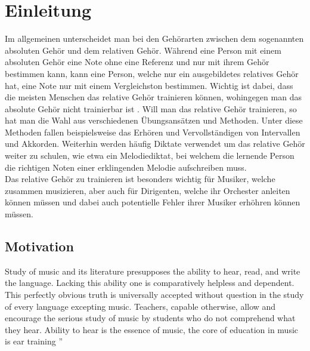 \begin{abstract}
    
\end{abstract}



\chapter{Einleitung}
Im allgemeinen unterscheidet man bei den Gehörarten zwischen dem sogenannten absoluten Gehör und dem relativen Gehör. Während eine Person mit einem absoluten Gehör eine Note ohne eine Referenz und nur mit ihrem Gehör bestimmen kann, kann eine Person, welche nur ein ausgebildetes relatives Gehör hat, eine Note nur mit einem Vergleichston bestimmen. Wichtig ist dabei, dass die meisten Menschen das relative Gehör trainieren können, wohingegen man das absolute Gehör nicht trainierbar ist \cite{gussmack2006latentes}. Will man das relative Gehör trainieren, so hat man die Wahl aus verschiedenen Übungsansätzen und Methoden. Unter diese Methoden fallen beispielsweise das Erhören und Vervollständigen von Intervallen und Akkorden. Weiterhin werden häufig Diktate verwendet um das relative Gehör weiter zu schulen, wie etwa ein Melodiediktat, bei welchem die lernende Person die richtigen Noten einer erklingenden Melodie aufschreiben muss. \\ 
Das relative Gehör zu trainieren ist besonders wichtig für Musiker, welche zusammen musizieren, aber auch für Dirigenten, welche ihr Orchester anleiten können müssen und dabei auch potentielle Fehler ihrer Musiker erhöhren können müssen. 

\section{Motivation}
\glqq 
Study of music and
its literature presupposes the ability to hear,
read, and write the language. Lacking this ability one is
comparatively helpless and dependent. This perfectly
obvious truth is universally accepted without question
in the study of every language excepting music. Teachers, capable otherwise, allow and encourage the serious
study of music by students who do not comprehend what
they hear. Ability to hear is the essence of music, the
core of education in music is ear training
''  \cite{spencer1947ear}

